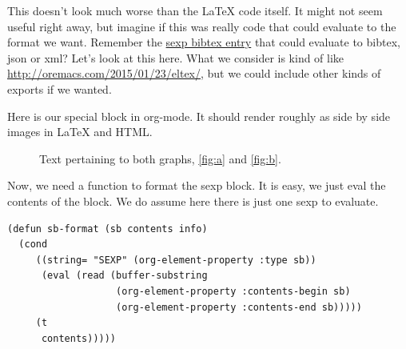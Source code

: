 \documentclass[11pt]{article}
\begin{document}
This doesn't look much worse than the \LaTeX{} code itself. It might not seem useful right away, but imagine if this was really code that could evaluate to the format we want. Remember the \href{http://kitchingroup.cheme.cmu.edu/blog/2015/06/10/A-sexp-version-of-a-bibtex-entry/}{sexp bibtex entry} that could evaluate to bibtex, json or xml? Let's look at this here. What we consider is kind of like \url{http://oremacs.com/2015/01/23/eltex/}, but we could include other kinds of exports if we wanted.

Here is our special block in org-mode. It should render roughly as side by side images in \LaTeX{} and HTML.

\begin{figure}
\enskip
{}
\caption{Text pertaining to both graphs, \ref{fig:a} and \ref{fig:b}.\label{fig12}}
\end{figure}

Now, we need a function to format the sexp block. It is easy, we just eval the contents of the block. We do assume here there is just one sexp to evaluate.
\begin{verbatim}
(defun sb-format (sb contents info)
  (cond
     ((string= "SEXP" (org-element-property :type sb))
      (eval (read (buffer-substring
                   (org-element-property :contents-begin sb)
                   (org-element-property :contents-end sb)))))
     (t
      contents)))))
\end{verbatim}
\end{document}
